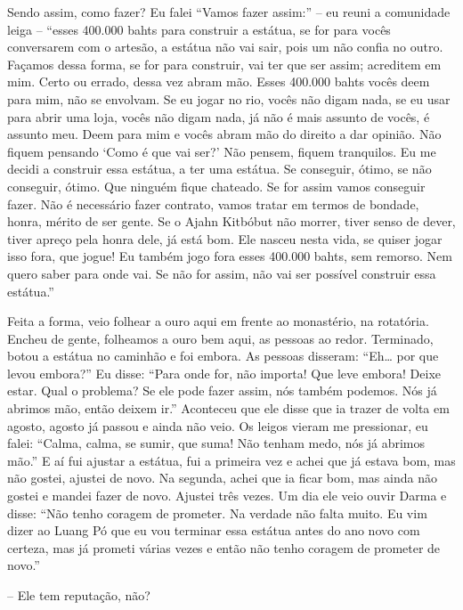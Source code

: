 Sendo assim, como fazer? Eu falei “Vamos fazer assim:” – eu reuni a
comunidade leiga – “esses 400.000 bahts para construir a estátua, se
for para vocês conversarem com o artesão, a estátua não vai sair, pois
um não confia no outro. Façamos dessa forma, se for para construir, vai
ter que ser assim; acreditem em mim. Certo ou errado, dessa vez abram
mão. Esses 400.000 bahts vocês deem para mim, não se envolvam. Se eu
jogar no rio, vocês não digam nada, se eu usar para abrir uma loja,
vocês não digam nada, já não é mais assunto de vocês, é assunto meu.
Deem para mim e vocês abram mão do direito a dar opinião. Não fiquem
pensando ‘Como é que vai ser?’ Não pensem, fiquem tranquilos. Eu me
decidi a construir essa estátua, a ter uma estátua. Se conseguir,
ótimo, se não conseguir, ótimo. Que ninguém fique chateado. Se for
assim vamos conseguir fazer. Não é necessário fazer contrato, vamos
tratar em termos de bondade, honra, mérito de ser gente. Se o Ajahn
Kitbóbut não morrer, tiver senso de dever, tiver apreço pela honra
dele, já está bom. Ele nasceu nesta vida, se quiser jogar isso fora,
que jogue! Eu também jogo fora esses 400.000 bahts, sem remorso. Nem
quero saber para onde vai. Se não for assim, não vai ser possível
construir essa estátua.”

Feita a forma, veio folhear a ouro aqui em frente ao monastério, na
rotatória. Encheu de gente, folheamos a ouro bem aqui, as pessoas ao
redor. Terminado, botou a estátua no caminhão e foi embora. As pessoas
disseram: “Eh… por que levou embora?” Eu disse: “Para onde for, não
importa! Que leve embora! Deixe estar. Qual o problema? Se ele pode
fazer assim, nós também podemos. Nós já abrimos mão, então deixem ir.”
Aconteceu que ele disse que ia trazer de volta em agosto, agosto já
passou e ainda não veio. Os leigos vieram me pressionar, eu falei:
“Calma, calma, se sumir, que suma! Não tenham medo, nós já abrimos
mão.” E aí fui ajustar a estátua, fui a primeira vez e achei que já
estava bom, mas não gostei, ajustei de novo. Na segunda, achei que ia
ficar bom, mas ainda não gostei e mandei fazer de novo. Ajustei três
vezes. Um dia ele veio ouvir Darma e disse: “Não tenho coragem de
prometer. Na verdade não falta muito. Eu vim dizer ao Luang Pó que eu
vou terminar essa estátua antes do ano novo com certeza, mas já prometi
várias vezes e então não tenho coragem de prometer de novo.”

-- Ele tem reputação, não?

